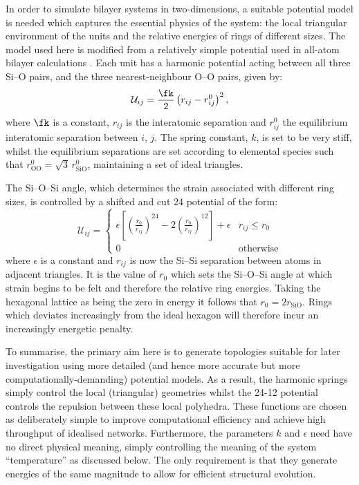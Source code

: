 In order to simulate bilayer systems in two\--dimensions, a suitable potential model is needed which captures the essential physics of the system: the local triangular environment of the \sioiii{} units and the relative energies of rings of different sizes. 
The model used here is modified from a relatively simple potential used in all\--atom bilayer calculations \cite{Wilson2013,Wilson2018}. 
Each \sioiii{} unit has a harmonic potential acting between all three Si\---O pairs, and the three nearest\--neighbour O\---O pairs, given by:
\begin{equation}
	\label{eq:harmonic}
	\mathcal{U}_{ij} = \frac{\fk}{2}\left(r_{ij}-r_{ij}^{0}\right)^{2},
\end{equation}
where $\fk$ is a constant, $r_{ij}$ is the interatomic separation and $r_{ij}^{0}$ the equilibrium interatomic separation between $i$, $j$. 
The spring constant, $k$, is set to be very stiff, whilst the equilibrium separations are set according to elemental species such that $r_{\text{OO}}^{0}=\sqrt{3}\,r_{\text{SiO}}^{0}$, maintaining a set of ideal \sioiii{} triangles. 

The Si\---O\---Si angle, which determines the strain associated with different ring sizes, is controlled by a shifted and cut 24 potential of the form:
\begin{equation}
	\mathcal{U}_{ij} = 
	\begin{cases}
	\epsilon \left[ \left(\frac{r_{0}}{r_{ij}}\right)^{24}-2\left(\frac{r_{0}}{r_{ij}}\right)^{12} \right] + \epsilon & r_{ij}\leq r_{0} \\
	0 & \text{otherwise}
	\end{cases}
\end{equation}
where $\epsilon$ is a constant and $r_{ij}$ is now the Si\---Si separation between atoms in adjacent triangles. 
It is the value of $r_{0}$ which sets the Si\---O\---Si angle at which strain begins to be felt and therefore the relative ring energies.
Taking the hexagonal lattice as being the zero in energy it follows that $r_{0}=2r_{\text{SiO}}$.
Rings which deviates increasingly from the ideal hexagon will therefore incur an increasingly energetic penalty.

To summarise, the primary aim here is to generate topologies suitable for later investigation using more detailed (and hence more accurate but more
computationally-demanding) potential models. 
As a result, the harmonic springs simply control the local (triangular) geometries whilst the 24-12 potential controls the repulsion between these local polyhedra. 
These functions are chosen as deliberately simple to improve computational efficiency and achieve high throughput of idealised networks. 
Furthermore, the parameters $k$ and $\epsilon$ need have no direct physical meaning, simply controlling the
meaning of the system ``temperature'' as discussed below. 
The only requirement is that they generate energies of the same magnitude to allow for efficient
structural evolution.

